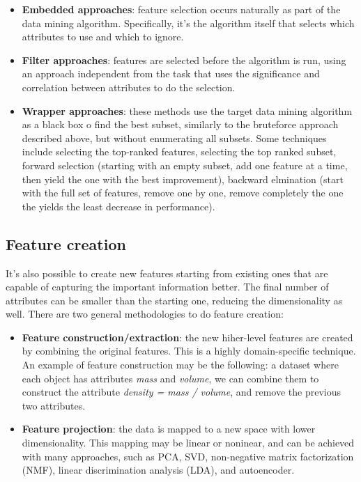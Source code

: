 \begin{itemize}
    \item \textbf{Embedded approaches}: feature selection occurs naturally as part of the data mining algorithm. Specifically, it's the algorithm itself that selects which attributes to use and which to ignore. 

    \item \textbf{Filter approaches}: features are selected before the algorithm is run, using an approach independent from the task that uses the significance and correlation between attributes to do the selection.

    \item \textbf{Wrapper approaches}: these methods use the target data mining algorithm as a black box o find the best subset, similarly to the bruteforce approach described above, but without enumerating all subsets. Some techniques include selecting the top-ranked features, selecting the top ranked subset, forward selection (starting with an empty subset, add one feature at a time, then yield the one with the best improvement), backward elmination (start with the full set of features, remove one by one, remove completely the one the yields the least decrease in performance).
\end{itemize}

\subsection{Feature creation}

It's also possible to create new features starting from existing ones that are capable of capturing the important information better. The final number of attributes can be smaller than the starting one, reducing the dimensionality as well. There are two general methodologies to do feature creation:

\begin{itemize}
    \item \textbf{Feature construction/extraction}: the new hiher-level features are created by combining the original features. This is a highly domain-specific technique. An example of feature construction may be the following: a dataset where each object has attributes \textit{mass} and \textit{volume}, we can combine them to construct the attribute \textit{density = mass / volume}, and remove the previous two attributes.

    \item \textbf{Feature projection}: the data is mapped to a new space with lower dimensionality. This mapping may be linear or noninear, and can be achieved with many approaches, such as PCA, SVD, non-negative matrix factorization (NMF), linear discrimination analysis (LDA), and autoencoder.
\end{itemize}

